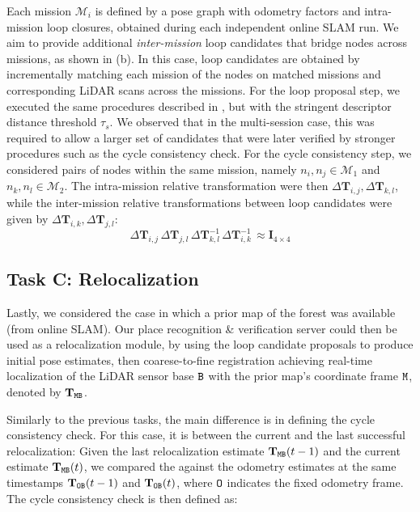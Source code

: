 Each mission ${\mathcal{M}_{i}}$ is defined by a pose graph with odometry factors and intra-mission loop closures, obtained during each independent online SLAM run. We aim to provide additional \emph{inter-mission} loop candidates that bridge nodes across missions, as shown in  (b). In this case, loop candidates are obtained by incrementally matching each mission of the nodes on matched missions and corresponding LiDAR scans across the missions.
For the loop proposal step, we executed the same procedures described in , but with the stringent descriptor distance threshold $\tau_{s}$. We observed that in the multi-session case, this was required to allow a larger set of candidates that were later verified by stronger procedures such as the cycle consistency check. 
For the cycle consistency step, we considered pairs of nodes within the same mission, namely $n_i, n_j \in \mathcal{M}_1$ and $n_k, n_l \in \mathcal{M}_2$. The intra-mission relative transformation were then $\Delta\mathbf{T}_{i,j}, \Delta\mathbf{T}_{k, l}$, while the inter-mission relative transformations between loop candidates were given by $\Delta\mathbf{T}_{i,k}, \Delta\mathbf{T}_{j,l}$:
\begin{equation}
  \label{eq:cycle-offline}
  \Delta\mathbf{T}_{i,j}\, \Delta\mathbf{T}_{j,l}\, \Delta\mathbf{T}_{k, l}^{-1}\, \Delta\mathbf{T}_{i,k}^{-1}\, \approx \mathbf{I}_{4\times4}
\end{equation}

\subsection*{Task C: Relocalization} \label{sec:relocalization}
Lastly, we considered the case in which a prior map of the forest was available (from online SLAM). Our place recognition \& verification server could then be used as a relocalization module, by using the loop candidate proposals to produce initial pose estimates, then coarese-to-fine registration achieving real-time localization of the LiDAR sensor base $\mathtt{B}$ with the prior map's coordinate frame $\mathtt{M}$, denoted by $\mathbf{T}_{\mathtt{M}\mathtt{B}}$.

Similarly to the previous tasks, the main difference is in defining the cycle consistency check. For this case, it is between the current and the last successful relocalization: Given the last relocalization estimate $\mathbf{T}_{\mathtt{M}\mathtt{B}}(t-1)$ and the current estimate $\mathbf{T}_{\mathtt{M}\mathtt{B}}(t)$, we compared the  against the odometry estimates at the same timestamps $\mathbf{T}_{\mathtt{O}\mathtt{B}}(t-1)$ and $\mathbf{T}_{\mathtt{O}\mathtt{B}}(t)$, where $\mathtt{O}$ indicates the fixed odometry frame. The cycle consistency check is then defined as:

